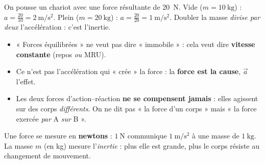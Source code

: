 \documentclass[11pt,a4paper]{article}
\newcommand{\vv}[1]{\vec{#1}}\newcommand{\ds}{\displaystyle}
\begin{document}
\begin{exemplebox}
On pousse un chariot avec une force résultante de \qty{20}{\newton}.
Vide ($m=\qty{10}{\kilogram}$) : $a=\tfrac{20}{10}=\qty{2}{\metre\per\second\squared}$.
Plein ($m=\qty{20}{\kilogram}$) : $a=\tfrac{20}{20}=\qty{1}{\metre\per\second\squared}$.
Doubler la masse \emph{divise par deux} l'accélération : c'est l'inertie.
\end{exemplebox}

\begin{piege}
\begin{itemize}[leftmargin=1.4em,topsep=2pt,itemsep=1.5pt]
  \item « Forces équilibrées » ne veut pas dire « immobile » : cela veut dire \textbf{vitesse constante}
        (repos \emph{ou} MRU).
  \item Ce n'est pas l'accélération qui « crée » la force : la \textbf{force est la cause}, $\vv a$ l'effet.
  \item Les deux forces d'action--réaction \textbf{ne se compensent jamais} : elles agissent sur des
        corps \emph{différents}. On ne dit pas « la force d'un corps » mais « la force exercée \emph{par} A \emph{sur} B ».
\end{itemize}
\end{piege}

\begin{remarque}
Une force se mesure en \textbf{newtons} : $\qty{1}{\newton}$ communique $\qty{1}{\metre\per\second\squared}$ à une masse
de $\qty{1}{\kilogram}$. La masse $m$ (en \si{\kilogram}) mesure l'\emph{inertie} : plus elle est grande, plus le
corps résiste au changement de mouvement.
\end{remarque}
\end{document}
